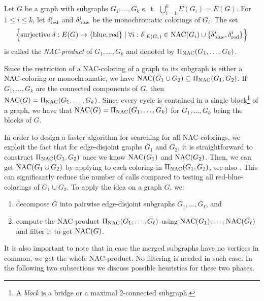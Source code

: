 \begin{definition}
	Let $G$ be a graph with subgraphs $G_1, \dots, G_k$
	s.\ t.\ $\bigcup_{i=1}^k E(G_i) =E(G)$.
	For $1\leq i \leq k$, let $\delta^{i}_{\text{red}}$ and
	$\delta^{i}_{\text{blue}}$ be the monochromatic colorings of $G_i$.
	The set
	\[ \Bigl\{
		\text{surjective }\delta : E(G) \to \{\text{blue}, \text{red}\}
		\mid\forall i : \delta |_{E(G_i)} \in
		\operatorname{NAC}(G_i) \cup \{\delta^{i}_{\text{blue}}, \delta^{i}_{\text{red}}\}
		\Bigr\}
	\]
	is called the \emph{NAC-product} of $G_1, \dots, G_k$ and denoted by $\operatorname{\Pi_{\operatorname{NAC}}}(G_1, \dots, G_k)$.
\end{definition}

Since the restriction of a NAC-coloring of a graph
to its subgraph is either a NAC-coloring or monochromatic,
we have $\operatorname{NAC}(G_{1} \cup G_{2}) \subseteq \operatorname{\Pi_{\operatorname{NAC}}}(G_{1}, G_{2})$.
If $G_1, \dots, G_k$ are the connected components of $G$,
then $\operatorname{NAC}(G) = \operatorname{\Pi_{\operatorname{NAC}}}(G_1,\ldots, G_k)$.
Since every cycle is contained in a single
block\footnote{A \emph{block} is a bridge or a maximal 2-connected subgraph.}
of a graph, we have that $\operatorname{NAC}(G) = \operatorname{\Pi_{\operatorname{NAC}}}(G_1,\ldots, G_k)$
for $G_1,\ldots, G_k$ being the blocks of $G$.

In order to design a faster algorithm for searching for all NAC-colorings,
we exploit the fact that for edge-disjoint graphs $G_1$ and $G_2$,
it is straightforward to construct $\operatorname{\Pi_{\operatorname{NAC}}}(G_{1}, G_{2})$ once we know $\operatorname{NAC}(G_1)$ and $\operatorname{NAC}(G_2)$.
Then, we can get $\operatorname{NAC}(G_{1} \cup G_{2})$ by applying \IsNACColoring{}
to each coloring in $\operatorname{\Pi_{\operatorname{NAC}}}(G_{1}, G_{2})$, see also .
This can significantly reduce the number of \IsNACColoring{} calls
compared to testing all red-blue-colorings of $G_{1} \cup G_{2}$.
To apply the idea on a graph $G$, we:
%
\begin{enumerate}
	\item decompose $G$ into pairwise edge-disjoint subgraphs $G_1, \ldots, G_\ell$, and
	\item compute the NAC-product $\operatorname{\Pi_{\operatorname{NAC}}}(G_1, \dots, G_\ell)$ using $\operatorname{NAC}(G_1), \ldots, \operatorname{NAC}(G_\ell)$
	      and filter it to get $\operatorname{NAC}(G)$.
\end{enumerate}
%
It is also important to note that in case the merged subgraphs
have no vertices in common, we get the whole NAC-product.
No filtering is needed in such case.
%
In the following two subsections we discuss possible heuristics
for these two phases.

